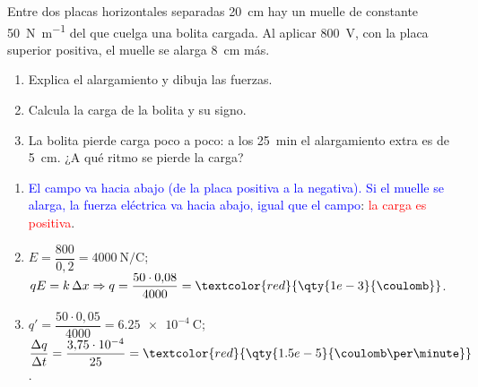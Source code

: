\begin{exercise}
    Entre dos placas horizontales separadas \qty{20}{\cm} hay un muelle de constante \qty{50}{\newton\per\m} del que cuelga una bolita
    cargada. Al aplicar \qty{800}{\volt}, con la placa superior positiva, el muelle se alarga \qty{8}{\cm} más.
    \begin{enumerate}[label=\letraminuscula]
        \item Explica el alargamiento y dibuja las fuerzas.
        \item Calcula la carga de la bolita y su signo.
        \item La bolita pierde carga poco a poco: a los \qty{25}{\minute} el alargamiento extra es de \qty{5}{\cm}. ¿A qué ritmo se pierde la carga?
    \end{enumerate}
    \begin{solu}
        \begin{enumerate}[label=\letraminuscula]
            \item \textcolor{blue}{El campo va hacia abajo (de la placa positiva a la negativa). Si el muelle se alarga, la fuerza eléctrica va hacia abajo,
            igual que el campo}: \textcolor{red}{la carga es positiva}.
            \item \(E = \dfrac{800}{0{,}2} = \qty{4000}{\newton\per\coulomb}\); \(qE = k\,\Delta x \Rightarrow q = \dfrac{50\cdot 0{,}08}{4000} = \textcolor{red}{\qty{1e-3}{\coulomb}}\).
            \item \(q' = \dfrac{50\cdot 0{,}05}{4000} = \qty{6.25e-4}{\coulomb}\); \(\dfrac{\Delta q}{\Delta t} = \dfrac{3{,}75\cdot 10^{-4}}{25} = \textcolor{red}{\qty{1.5e-5}{\coulomb\per\minute}}\).
        \end{enumerate}
    \end{solu}
\end{exercise}
